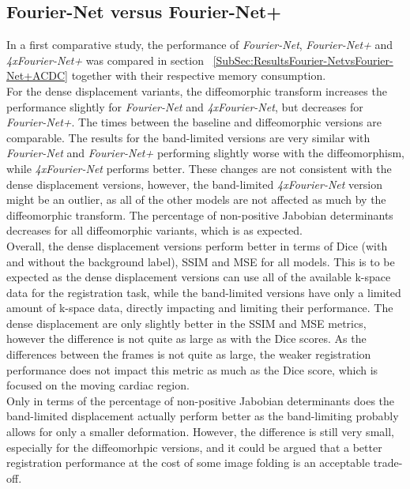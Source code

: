 \subsection{Fourier-Net versus Fourier-Net+} \label{SubSec:DiscussionFourier-NetvsFourier-Net+ACDC}
In a first comparative study, the performance of \emph{Fourier-Net}, \emph{Fourier-Net+} and \emph{4xFourier-Net+} was compared in section ~\ref{SubSec:ResultsFourier-NetvsFourier-Net+ACDC} together with their respective memory consumption.\\
For the dense displacement variants, the diffeomorphic transform increases the performance slightly for \emph{Fourier-Net} and \emph{4xFourier-Net}, but decreases for \emph{Fourier-Net+}. The times between the baseline and diffeomorphic versions are comparable.
The results for the band-limited versions are very similar with \emph{Fourier-Net} and \emph{Fourier-Net+} performing slightly worse  with the diffeomorphism, while \emph{4xFourier-Net} performs better.  These changes are not consistent with the dense displacement versions, however, the band-limited \emph{4xFourier-Net} version might be an outlier, as all of the other models are not affected as much by the diffeomorphic transform. The percentage of non-positive Jabobian determinants decreases for all diffeomorphic variants, which is as expected.\\
Overall, the dense displacement versions perform better in terms of Dice (with and without the background label), SSIM and MSE for all models. This is to be expected as the dense displacement versions can use all of the available k-space data for the registration task, while the band-limited versions have only a limited amount of k-space data, directly impacting and limiting their performance. The dense displacement are only slightly better in the SSIM and MSE metrics, however the difference is not quite as large as with the Dice scores. As the differences between the frames is not quite as large, the weaker registration performance does not impact this metric as much as the Dice score, which is focused on the moving cardiac region.\\
Only in terms of the percentage of non-positive Jabobian determinants does the band-limited displacement actually perform better as the band-limiting probably allows for only a smaller deformation. However, the difference is still very small, especially for the diffeomorhpic versions, and it could be argued that a better registration performance at the cost of some image folding is an acceptable trade-off. \\
